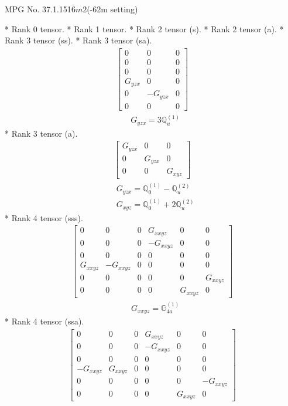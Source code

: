 \documentclass[fleqn,8pt,landscape]{jsarticle}
\begin{document}
\setcounter{MaxMatrixCols}{32}

\renewcommand{\tablename}{Table~}
\renewcommand{\figurename}{Figure~}
\begin{center}
\LARGE
MPG No. 37.1.151\quad$\bar{6}m2$\quad(-62m setting)
\end{center}
* Rank 0 tensor.
* Rank 1 tensor.
* Rank 2 tensor (s).
* Rank 2 tensor (a).
* Rank 3 tensor (ss).
* Rank 3 tensor (sa).
\begin{align*}
\begin{bmatrix} 0 & 0 & 0 \\ 0 & 0 & 0 \\ 0 & 0 & 0 \\ G_{yzx} & 0 & 0 \\ 0 & - G_{yzx} & 0 \\ 0 & 0 & 0 \end{bmatrix}
\end{align*}
\begin{align*}
& G_{yzx} = 3 \mathbb{Q}_{u}^{(1)}
\end{align*}
* Rank 3 tensor (a).
\begin{align*}
\begin{bmatrix} G_{yzx} & 0 & 0 \\ 0 & G_{yzx} & 0 \\ 0 & 0 & G_{xyz} \end{bmatrix}
\end{align*}
\begin{align*}
& G_{yzx} = \mathbb{Q}_{0}^{(1)} - \mathbb{Q}_{u}^{(2)} \\
& G_{xyz} = \mathbb{Q}_{0}^{(1)} + 2 \mathbb{Q}_{u}^{(2)}
\end{align*}
* Rank 4 tensor (sss).
\begin{align*}
\begin{bmatrix} 0 & 0 & 0 & G_{xxyz} & 0 & 0 \\ 0 & 0 & 0 & - G_{xxyz} & 0 & 0 \\ 0 & 0 & 0 & 0 & 0 & 0 \\ G_{xxyz} & - G_{xxyz} & 0 & 0 & 0 & 0 \\ 0 & 0 & 0 & 0 & 0 & G_{xxyz} \\ 0 & 0 & 0 & 0 & G_{xxyz} & 0 \end{bmatrix}
\end{align*}
\begin{align*}
& G_{xxyz} = \mathbb{G}_{4a}^{(1)}
\end{align*}
* Rank 4 tensor (ssa).
\begin{align*}
\begin{bmatrix} 0 & 0 & 0 & G_{xxyz} & 0 & 0 \\ 0 & 0 & 0 & - G_{xxyz} & 0 & 0 \\ 0 & 0 & 0 & 0 & 0 & 0 \\ - G_{xxyz} & G_{xxyz} & 0 & 0 & 0 & 0 \\ 0 & 0 & 0 & 0 & 0 & - G_{xxyz} \\ 0 & 0 & 0 & 0 & G_{xxyz} & 0 \end{bmatrix}
\end{align*}
\end{document}

